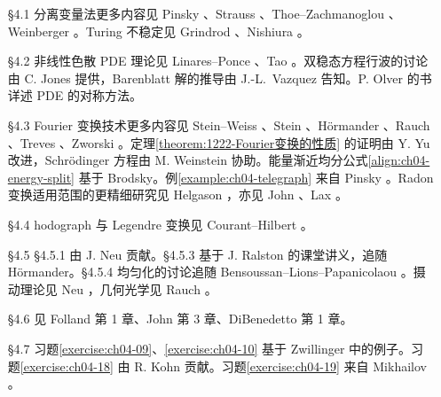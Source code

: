 \documentclass[../../main.tex]{subfiles}
\begin{document}
\begin{itemize}
\item[\S4.1] 分离变量法更多内容见 Pinsky \cite{P}、Strauss \cite{St2}、Thoe--Zachmanoglou \cite{T-Z}、Weinberger \cite{We}。Turing 不稳定见 Grindrod \cite{Gr}、Nishiura \cite{N}。
\item[\S4.2] 非线性色散 PDE 理论见 Linares--Ponce \cite{L-P}、Tao \cite{To}。双稳态方程行波的讨论由 C. Jones 提供，Barenblatt 解的推导由 J.-L.\ Vazquez 告知。P. Olver 的书 \cite{O1} 详述 PDE 的对称方法。
\item[\S4.3] Fourier 变换技术更多内容见 Stein--Weiss \cite{S-W}、Stein \cite{Se}、Hörmander \cite{H}、Rauch \cite{R1}、Treves \cite{T}、Zworski \cite{Zi}。定理\cref{theorem:1222-Fourier变换的性质} 的证明由 Y. Yu 改进，Schrödinger 方程由 M. Weinstein 协助。能量渐近均分公式\eqref{align:ch04-energy-split} 基于 Brodsky。例\cref{example:ch04-telegraph} 来自 Pinsky \cite{P}。Radon 变换适用范围的更精细研究见 Helgason \cite{Hg}，亦见 John \cite{J1}、Lax \cite{Lx3}。
\item[\S4.4] hodograph 与 Legendre 变换见 Courant--Hilbert \cite{C-H}。
\item[\S4.5] \S4.5.1 由 J. Neu 贡献。\S4.5.3 基于 J. Ralston 的课堂讲义，追随 Hörmander。\S4.5.4 均匀化的讨论追随 Bensoussan--Lions--Papanicolaou \cite{B-L-P}。摄动理论见 Neu \cite{Ne2}，几何光学见 Rauch \cite{R2}。
\item[\S4.6] 见 Folland \cite{F1} 第 1 章、John \cite{J2} 第 3 章、DiBenedetto \cite{DB1} 第 1 章。
\item[\S4.7] 习题\cref{exercise:ch04-09}、\cref{exercise:ch04-10} 基于 Zwillinger \cite{Zw} 中的例子。习题\cref{exercise:ch04-18} 由 R. Kohn 贡献。习题\cref{exercise:ch04-19} 来自 Mikhailov \cite{M}。
\end{itemize}
\end{document}

